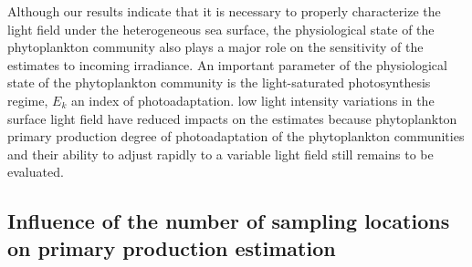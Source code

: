 Although our results indicate that it is necessary to properly characterize the light field under the heterogeneous sea surface, the physiological state of the phytoplankton community \DIFaddbegin {}\DIFaddend also plays a major role on the sensitivity of the estimates to incoming irradiance. An important parameter of the physiological state of the phytoplankton community is the light-saturated photosynthesis regime, $E_k$ an index of photoadaptation. \DIFdelbegin {}\DIFdelend \DIFaddbegin {}\DIFaddend low light intensity\DIFdelbegin \DIFdel{\mbox{%
\citep }\hspace{0pt}%
}%
\DIFdelend \DIFaddbegin {}\DIFaddend variations in the surface light field \DIFaddbegin {}\DIFaddend have reduced impacts on the estimates because phytoplankton primary production \DIFdelbegin {}\DIFdelend \DIFaddbegin {}\micromol{}\micromol{}\DIFaddend degree of photoadaptation of the phytoplankton communities and their ability to adjust rapidly to a variable light field still remains to be evaluated.

\subsection{Influence of the number of sampling locations on primary production estimation}

